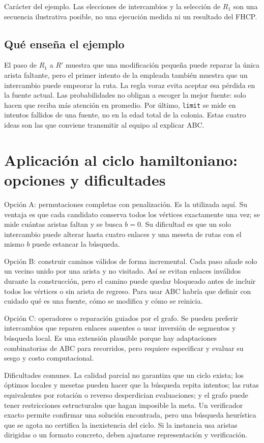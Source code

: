 Carácter del ejemplo. Las elecciones de intercambios y la selección de $R_1$ son una secuencia ilustrativa posible, no una ejecución medida ni un resultado del FHCP.

\subsection{Qué enseña el ejemplo}
El paso de $R_1$ a $R'$ muestra que una modificación pequeña puede reparar la única arista faltante, pero el primer intento de la empleada también muestra que un intercambio puede empeorar la ruta. La regla voraz evita aceptar esa pérdida en la fuente actual. Las probabilidades no obligan a escoger la mejor fuente: solo hacen que reciba más atención en promedio. Por último, \texttt{limit} se mide en intentos fallidos de una fuente, no en la edad total de la colonia. Estas cuatro ideas son las que conviene transmitir al equipo al explicar ABC.

\section{Aplicación al ciclo hamiltoniano: opciones y dificultades}
Opción A: permutaciones completas con penalización. Es la utilizada aquí. Su ventaja es que cada candidato conserva todos los vértices exactamente una vez; se mide cuántas aristas faltan y se busca $b=0$. Su dificultad es que un solo intercambio puede alterar hasta cuatro enlaces y una meseta de rutas con el mismo $b$ puede estancar la búsqueda.

Opción B: construir caminos válidos de forma incremental. Cada paso añade solo un vecino unido por una arista y no visitado. Así se evitan enlaces inválidos durante la construcción, pero el camino puede quedar bloqueado antes de incluir todos los vértices o sin arista de regreso. Para usar ABC habría que definir con cuidado qué es una fuente, cómo se modifica y cómo se reinicia.

Opción C: operadores o reparación guiados por el grafo. Se pueden preferir intercambios que reparen enlaces ausentes o usar inversión de segmentos y búsqueda local. Es una extensión plausible porque hay adaptaciones combinatorias de ABC para recorridos, pero requiere especificar y evaluar su sesgo y costo computacional.\cite{abc9}

Dificultades comunes. La calidad parcial no garantiza que un ciclo exista; los óptimos locales y mesetas pueden hacer que la búsqueda repita intentos; las rutas equivalentes por rotación o reverso desperdician evaluaciones; y el grafo puede tener restricciones estructurales que hagan imposible la meta. Un verificador exacto permite confirmar una solución encontrada, pero una búsqueda heurística que se agota no certifica la inexistencia del ciclo. Si la instancia usa aristas dirigidas o un formato concreto, deben ajustarse representación y verificación.

